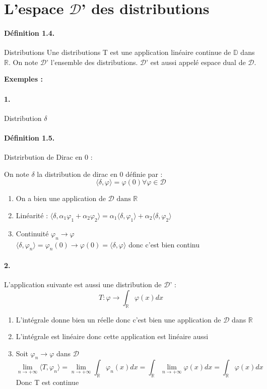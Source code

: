 \documentclass[12pt,a4paper]{report}
\newcommand{\Ens}[1]{\ensuremath{\mathbb{#1}}}
\newcommand{\ens}[1]{\ensuremath{\mathbb{#1}}}
\newcommand{\D}{\ensuremath{\mathcal{D}}}
\begin{document}
\section{L'espace \D' des distributions}

\paragraph{Définition 1.4.} Distributions
Une distributions T est une application linéaire continue de \(\mathbb{D}\) dans \(\mathbb{R}\).
On note \D' l'ensemble des distributions. \D' est aussi appelé espace dual de \D.

\textbf{Exemples :}

\paragraph{1.} Distribution \(\delta\)
\paragraph{Définition 1.5.} Distrirbution de Dirac en 0 :

On note \(\delta\) la distribution de dirac en 0 définie par :
\[
	\langle \delta, \varphi \rangle = \varphi(0) \forall \varphi \in \D
\]

\begin{enumerate}
	\item On a bien une application de \(\D \text{ dans } \mathbb{R}\)
	\item Linéarité : \(\langle \delta, \alpha_1 \varphi_1 + 	\alpha_2 \varphi_2 \rangle = \alpha_1 \langle \delta, \varphi_1 \rangle + \alpha_2 \langle \delta, \varphi_2 \rangle\)
	\item Continuité \(\varphi_n \rightarrow \varphi\)\\
	\(\langle \delta, \varphi_n \rangle = \varphi_n (0) \rightarrow \varphi(0) = \langle \delta, \varphi \rangle\) donc c'est bien continu 
\end{enumerate}

\paragraph{2.} L'application suivante est aussi une distribution de \D' :
\[
	T : \varphi \rightarrow \int_{\Ens{R}} \varphi(x) dx
\]
\begin{enumerate}
	\item L'intégrale donne bien un réelle donc c'est bien une application de \(\D\) dans \(\Ens{R}\)
	\item L'intégrale est linéaire donc cette application est linéaire aussi
	\item Soit \(\varphi_n \rightarrow \varphi\) dans \D
	\[
		\lim_{n \rightarrow +\infty} \langle T, \varphi_n \rangle = \lim_{n \rightarrow +\infty} \int_{\ens{R}} \varphi_n (x) dx = \int_{\ens{R}} \lim_{n \rightarrow +\infty} \varphi (x) dx = \int_{\ens{R}} \varphi(x) dx
	\]
	Donc T est continue
\end{enumerate}
\end{document}
